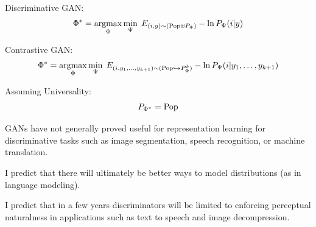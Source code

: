 {

Discriminative GAN:
{\color{red} $$\Phi^* = \operatorname*{argmax}_\Phi \min_\Psi \;E_{(i,y) \sim (\mathrm{Pop} \uplus P_\Phi)} - \ln P_\Psi(i|y)$$}

\vfill
Contrastive GAN:
{\color{red} $$\Phi^* = \operatorname*{argmax}_\Phi \min_\Psi \;E_{(i,y_1,\ldots,y_{k+1}) \sim (\mathrm{Pop} \hookrightarrow P_\Phi^k)} - \ln P_\Psi(i|y_1,\ldots,y_{k+1})$$}

\vfill
Assuming Universality:
{\color{red} $$P_{\Phi^*} = \mathrm{Pop}$$}


GANs have not generally proved useful for representation learning for discriminative tasks
such as image segmentation, speech recognition, or machine translation.

\vfill
I predict that there will ultimately be better ways to model distributions (as in language modeling).

\vfill
I predict that in a few years discriminators will be limited to enforcing perceptual naturalness in applications such as
text to speech and image decompression.


}

